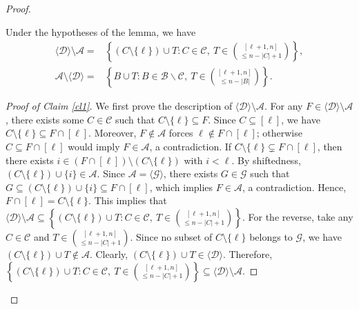 \documentclass[10pt,a4paper]{amsart}
\begin{document}
\begin{proof}
\begin{claim}\label{cl1}
Under the hypotheses of the lemma, we have
\begin{align*}
\langle\mathcal{D}\rangle\setminus\mathcal{A}=&\left\{(C\setminus\{\ell\})\cup T: C\in\mathcal{C},\ T\in\binom{[\ell+1,n]}{\leq n-|C|+1}\right\},\\
\mathcal{A}\setminus\langle\mathcal{D}\rangle=&\left\{B\cup T: B\in\mathcal{B}\backslash \mathcal{C},\ T\in\binom{[\ell+1,n]}{\leq n-|B|}\right\}.
 \end{align*}
\end{claim}
\begin{proof}[Proof of Claim \ref{cl1}]
We first prove the description of $\langle\mathcal{D}\rangle\setminus\mathcal{A}$.
For any $F\in\langle\mathcal{D}\rangle\setminus\mathcal{A}$, there exists some $C\in\mathcal{C}$ such that $C\setminus\{\ell\}\subseteq F$.  Since $C\subseteq [\ell]$, we have $C\setminus\{\ell\}\subseteq F\cap[\ell]$.
Moreover, $F\notin\mathcal{A}$  forces  $\ell \notin F\cap[\ell]$; otherwise $C\subseteq F\cap[\ell]$ would imply $F\in\mathcal{A}$, a contradiction.
If $C\setminus\{\ell\}\subsetneq F\cap[\ell]$, then there exists $i\in(F\cap[\ell])\setminus(C\setminus\{\ell\})$ with $i<\ell$. By shiftedness, $(C\setminus\{\ell\})\cup\{i\}\in\mathcal{A}$. Since 
$\mathcal{A}= \langle\mathcal{G}\rangle$, there exists $G\in\mathcal{G}$ such that $G\subseteq(C\setminus\{\ell\})\cup\{i\}\subseteq F\cap[\ell]$, which implies  $F\in\mathcal{A}$, a contradiction. 
Hence, $F\cap[\ell]=C\setminus\{\ell\}$. This implies that
$\langle\mathcal{D}\rangle\setminus\mathcal{A}\subseteq\left\{(C\setminus\{\ell\})\cup T: C\in\mathcal{C},\ T\in\binom{[\ell+1,n]}{\leq n-|C|+1}\right\}.$  
For the reverse, take any  $C\in\mathcal{C}$ and $ T\in\binom{[\ell+1,n]}{\leq n-|C|+1}$.
Since no subset of $C\setminus\{\ell\}$ belongs to $\mathcal{G}$,
 we have $(C\setminus\{\ell\})\cup T \notin \mathcal{A}$. Clearly, $(C\setminus\{\ell\})\cup T \in \langle\mathcal{D}\rangle$. 
Therefore, 
$\left\{(C\setminus\{\ell\})\cup T: C\in\mathcal{C},\ T\in\binom{[\ell+1,n]}{\leq n-|C|+1}\right\} \subseteq\langle\mathcal{D}\rangle\setminus\mathcal{A}$.




\end{proof}
\end{proof}
\end{document}
